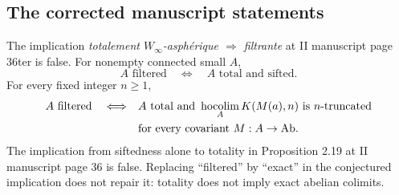 \subsection{The corrected manuscript statements}
\begin{proposition}\label{D:manuscript}
The implication \emph{totalement $W_\infty$-asph\'erique
$\Longrightarrow$ filtrante} at II manuscript page 36ter is false.
For nonempty connected small $A$,
\[
 A\text{ filtered}\quad\Longleftrightarrow\quad
 A\text{ total and sifted}.
\]
For every fixed integer $n\geq1$,
\[
\begin{split}
 A\text{ filtered}\quad\Longleftrightarrow\quad&
 A\text{ total and }
 \operatorname*{hocolim}_A K(M(a),n)\text{ is }n\text{-truncated}\\
 &\text{for every covariant }M:A\to\mathrm{Ab}.
\end{split}
\]
The implication from siftedness alone to totality in Proposition
2.19 at II manuscript page 36 is false.
Replacing ``filtered'' by ``exact'' in the conjectured implication
does not repair it: totality does not imply exact abelian colimits.
\end{proposition}

